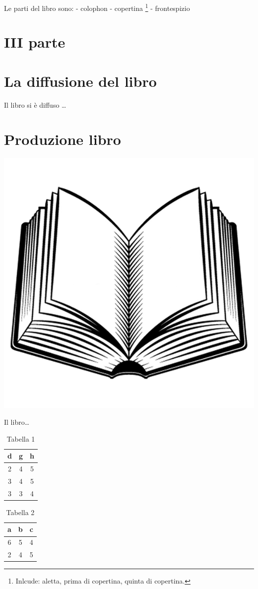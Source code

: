 \documentclass[
]{book}
\begin{document}
Le parti del libro sono:
- colophon
- copertina \footnote{Inlcude: aletta, prima di copertina, quinta di copertina.}
- frontespizio

\hypertarget{iii-parte}{%
\chapter*{III parte}\label{iii-parte}}

\hypertarget{la-diffusione-del-libro}{%
\chapter{La diffusione del libro}\label{la-diffusione-del-libro}}

Il libro si è diffuso \ldots{}

\hypertarget{produzione-libro}{%
\chapter{Produzione libro}\label{produzione-libro}}

\begin{center}\includegraphics[width=0.3\linewidth]{images/logo} \end{center}

Il libro\ldots{}

\begin{table}

\caption{\label{tab:unnamed-chunk-2}Tabella 1}
\centering
\begin{tabular}[t]{c|c|c}
\hline
d & g & h\\
\hline
2 & 4 & 5\\
\hline
3 & 4 & 5\\
\hline
3 & 3 & 4\\
\hline
\end{tabular}
\end{table}

\begin{table}

\caption{\label{tab:unnamed-chunk-3}Tabella 2}
\centering
\begin{tabular}[t]{c|c|c}
\hline
a & b & c\\
\hline
6 & 5 & 4\\
\hline
2 & 4 & 5\\
\hline
\end{tabular}
\end{table}
\end{document}
